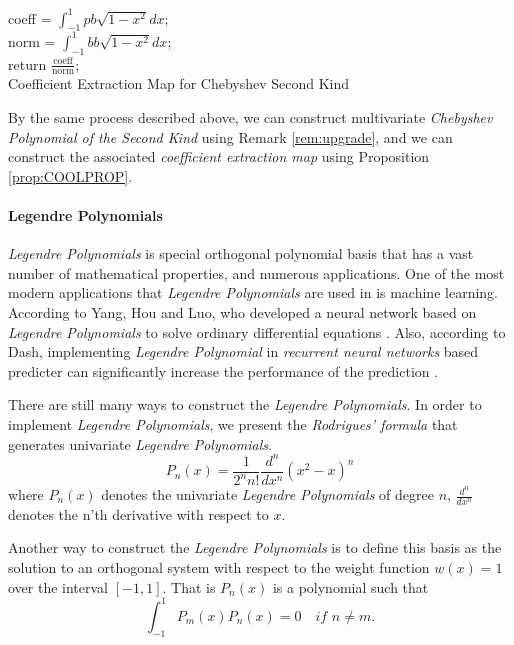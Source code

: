 \documentclass[12pt]{amsart}
\numberwithin{equation}{section}
\theoremstyle{definition}
\numberwithin{thm}{section}
\begin{document}
\begin{algorithm}[H]
     \SetAlgoLined
     coeff = $\int_{-1}^1 pb\sqrt{1-x^2} dx$;\\
     norm = $\int_{-1}^1 bb\sqrt{1-x^2} dx$;\\
     return $\frac{\text{coeff}}{\text{norm}}$;\\
     \caption{Coefficient Extraction Map for Chebyshev Second Kind}
\end{algorithm}

By the same process described above, we can construct multivariate \emph{Chebyshev Polynomial of the Second Kind} using Remark \ref{rem:upgrade},
and we can construct the associated \emph{coefficient extraction map} using Proposition \ref{prop:COOLPROP}.

\smallskip

\paragraph{Legendre Polynomials}
\emph{Legendre Polynomials} is special orthogonal polynomial basis that
has a vast number of mathematical properties, and numerous applications.
One of the most modern applications that \emph{Legendre Polynomials} are used in
is machine learning. According to Yang, Hou and Luo, who developed a neural
network based on \emph{Legendre Polynomials} to solve ordinary differential equations \cite{Yang2018}.
Also, according to Dash, implementing \emph{Legendre Polynomial} in \emph{recurrent neural networks} based predicter can
significantly increase the performance of the prediction \cite{DASH20201000}. 

There are still many ways to construct the \emph{Legendre Polynomials}. 
In order to implement \emph{Legendre Polynomials}, we present the \emph{Rodrigues' formula}
that generates univariate \emph{Legendre Polynomials}.
\begin{equation*}
     P_n(x) = \frac{1}{2^n n!} \frac{d^n}{dx^n} (x^2 - x)^n
\end{equation*}
where $P_n(x)$ denotes the univariate \emph{Legendre Polynomials} of degree $n$,
$\frac{d^n}{dx^n}$ denotes the n'th derivative with respect to $x$. 

Another way to construct the \emph{Legendre Polynomials} is to define this basis
as the solution to an orthogonal system with respect to the weight function 
$w(x)=1$ over the interval $[-1, 1]$. That is $P_n(x)$ is a polynomial such that
\begin{equation*}
     \int_{-1}^{1} P_m(x) P_n(x) = 0 \quad \textit{if } n \neq m.
\end{equation*}
\end{document}
